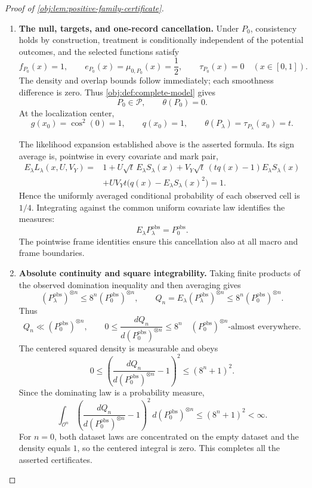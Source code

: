\begin{proof}[Proof of \cref{obj:lem:positive-family-certificate}]
\begin{enumerate}
\item \textbf{The null, targets, and one-record cancellation.}
Under \(P_0\), consistency holds by construction, treatment is
conditionally independent of the potential outcomes, and the selected
functions satisfy
\[
f_{P_0}(x)=1,\qquad
e_{P_0}(x)=\mu_{0,P_0}(x)=\frac12,\qquad
\tau_{P_0}(x)=0
\quad(x\in[0,1]).
\]
The density and overlap bounds follow immediately; each smoothness
difference is zero. Thus \cref{obj:def:complete-model} gives
\[
P_0\in\mathcal P,\qquad \theta(P_0)=0.
\]
At the localization center,
\[
g(x_0)=\cos^2(0)=1,\qquad q(x_0)=1,
\qquad
\theta(P_\lambda)=\tau_{P_\lambda}(x_0)=t.
\]

The likelihood expansion established above is the asserted formula.
Its sign average is, pointwise in every covariate and mark pair,
\[
\begin{aligned}
E_\lambda L_\lambda(x,U,V_Y)
={}&1+U\sqrt t\,E_\lambda S_\lambda(x)
 +V_Y\sqrt t\,(tq(x)-1)E_\lambda S_\lambda(x)\\
&+UV_Yt\bigl(q(x)-E_\lambda S_\lambda(x)^2\bigr)
=1.
\end{aligned}
\]
Hence the uniformly averaged conditional probability of each observed
cell is \(1/4\). Integrating against the common uniform covariate law
identifies the measures:
\[
E_\lambda P_\lambda^{\mathrm{obs}}=P_0^{\mathrm{obs}}.
\]
The pointwise frame identities ensure this cancellation also at all
macro and frame boundaries.

\item \textbf{Absolute continuity and square integrability.}
Taking finite products of the observed domination inequality and
then averaging gives
\[
(P_\lambda^{\mathrm{obs}})^{\otimes n}
\le8^n(P_0^{\mathrm{obs}})^{\otimes n},
\qquad
Q_n=E_\lambda(P_\lambda^{\mathrm{obs}})^{\otimes n}
\le8^n(P_0^{\mathrm{obs}})^{\otimes n}.
\]
Thus
\[
Q_n\ll(P_0^{\mathrm{obs}})^{\otimes n},
\qquad
0\le\frac{dQ_n}{d(P_0^{\mathrm{obs}})^{\otimes n}}
\le8^n
\quad (P_0^{\mathrm{obs}})^{\otimes n}\text{-almost everywhere}.
\]
The centered squared density is measurable and obeys
\[
0\le
\left(\frac{dQ_n}{d(P_0^{\mathrm{obs}})^{\otimes n}}-1\right)^2
\le(8^n+1)^2.
\]
Since the dominating law is a probability measure,
\[
\int_{\mathcal O^n}
\left(\frac{dQ_n}{d(P_0^{\mathrm{obs}})^{\otimes n}}-1\right)^2
\,d(P_0^{\mathrm{obs}})^{\otimes n}
\le(8^n+1)^2<\infty.
\]
For \(n=0\), both dataset laws are concentrated on the empty dataset
and the density equals \(1\), so the centered integral is zero.
This completes all the asserted certificates.
\end{enumerate}
\end{proof}
